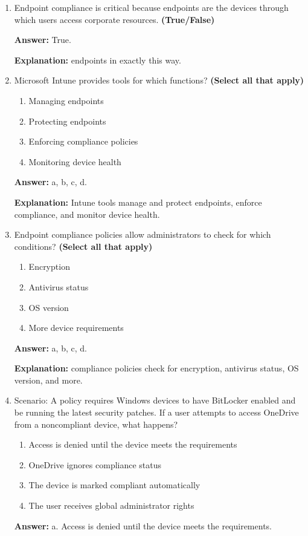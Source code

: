 \documentclass[10pt]{article}
\begin{document}
\begin{enumerate}[leftmargin=*]
\textbf{Explanation:} Phase 3 is specifically titled Enforce endpoint compliance.

\item Endpoint compliance is critical because endpoints are the devices through which users access corporate resources. \textbf{(True/False)}

\textbf{Answer:} True.

\textbf{Explanation:} endpoints in exactly this way.

\item Microsoft Intune provides tools for which functions? \textbf{(Select all that apply)}
\begin{enumerate}[label=\alph*., leftmargin=1.5em]
\item Managing endpoints
\item Protecting endpoints
\item Enforcing compliance policies
\item Monitoring device health
\end{enumerate}
\textbf{Answer:} a, b, c, d.

\textbf{Explanation:} Intune tools manage and protect endpoints, enforce compliance, and monitor device health.

\item Endpoint compliance policies allow administrators to check for which conditions? \textbf{(Select all that apply)}
\begin{enumerate}[label=\alph*., leftmargin=1.5em]
\item Encryption
\item Antivirus status
\item OS version
\item More device requirements
\end{enumerate}
\textbf{Answer:} a, b, c, d.

\textbf{Explanation:} compliance policies check for encryption, antivirus status, OS version, and more.

\item Scenario: A policy requires Windows devices to have BitLocker enabled and be running the latest security patches. If a user attempts to access OneDrive from a noncompliant device, what happens?
\begin{enumerate}[label=\alph*., leftmargin=1.5em]
\item Access is denied until the device meets the requirements
\item OneDrive ignores compliance status
\item The device is marked compliant automatically
\item The user receives global administrator rights
\end{enumerate}
\textbf{Answer:} a. Access is denied until the device meets the requirements.


\end{enumerate}
\end{document}
